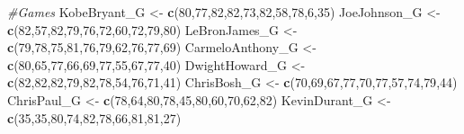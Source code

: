 \documentclass[
]{article}
\newenvironment{Shaded}{\begin{snugshade}}{\end{snugshade}}
\newcommand{\CommentTok}[1]{\textcolor[rgb]{0.56,0.35,0.01}{\textit{#1}}}
\newcommand{\DecValTok}[1]{\textcolor[rgb]{0.00,0.00,0.81}{#1}}
\newcommand{\KeywordTok}[1]{\textcolor[rgb]{0.13,0.29,0.53}{\textbf{#1}}}
\newcommand{\NormalTok}[1]{#1}
\newcommand{\StringTok}[1]{\textcolor[rgb]{0.31,0.60,0.02}{#1}}
\begin{document}
\begin{Shaded}
\begin{Highlighting}[]
\CommentTok{#Games }
\NormalTok{KobeBryant_G <-}\StringTok{ }\KeywordTok{c}\NormalTok{(}\DecValTok{80}\NormalTok{,}\DecValTok{77}\NormalTok{,}\DecValTok{82}\NormalTok{,}\DecValTok{82}\NormalTok{,}\DecValTok{73}\NormalTok{,}\DecValTok{82}\NormalTok{,}\DecValTok{58}\NormalTok{,}\DecValTok{78}\NormalTok{,}\DecValTok{6}\NormalTok{,}\DecValTok{35}\NormalTok{)}
\NormalTok{JoeJohnson_G <-}\StringTok{ }\KeywordTok{c}\NormalTok{(}\DecValTok{82}\NormalTok{,}\DecValTok{57}\NormalTok{,}\DecValTok{82}\NormalTok{,}\DecValTok{79}\NormalTok{,}\DecValTok{76}\NormalTok{,}\DecValTok{72}\NormalTok{,}\DecValTok{60}\NormalTok{,}\DecValTok{72}\NormalTok{,}\DecValTok{79}\NormalTok{,}\DecValTok{80}\NormalTok{)}
\NormalTok{LeBronJames_G <-}\StringTok{ }\KeywordTok{c}\NormalTok{(}\DecValTok{79}\NormalTok{,}\DecValTok{78}\NormalTok{,}\DecValTok{75}\NormalTok{,}\DecValTok{81}\NormalTok{,}\DecValTok{76}\NormalTok{,}\DecValTok{79}\NormalTok{,}\DecValTok{62}\NormalTok{,}\DecValTok{76}\NormalTok{,}\DecValTok{77}\NormalTok{,}\DecValTok{69}\NormalTok{)}
\NormalTok{CarmeloAnthony_G <-}\StringTok{ }\KeywordTok{c}\NormalTok{(}\DecValTok{80}\NormalTok{,}\DecValTok{65}\NormalTok{,}\DecValTok{77}\NormalTok{,}\DecValTok{66}\NormalTok{,}\DecValTok{69}\NormalTok{,}\DecValTok{77}\NormalTok{,}\DecValTok{55}\NormalTok{,}\DecValTok{67}\NormalTok{,}\DecValTok{77}\NormalTok{,}\DecValTok{40}\NormalTok{)}
\NormalTok{DwightHoward_G <-}\StringTok{ }\KeywordTok{c}\NormalTok{(}\DecValTok{82}\NormalTok{,}\DecValTok{82}\NormalTok{,}\DecValTok{82}\NormalTok{,}\DecValTok{79}\NormalTok{,}\DecValTok{82}\NormalTok{,}\DecValTok{78}\NormalTok{,}\DecValTok{54}\NormalTok{,}\DecValTok{76}\NormalTok{,}\DecValTok{71}\NormalTok{,}\DecValTok{41}\NormalTok{)}
\NormalTok{ChrisBosh_G <-}\StringTok{ }\KeywordTok{c}\NormalTok{(}\DecValTok{70}\NormalTok{,}\DecValTok{69}\NormalTok{,}\DecValTok{67}\NormalTok{,}\DecValTok{77}\NormalTok{,}\DecValTok{70}\NormalTok{,}\DecValTok{77}\NormalTok{,}\DecValTok{57}\NormalTok{,}\DecValTok{74}\NormalTok{,}\DecValTok{79}\NormalTok{,}\DecValTok{44}\NormalTok{)}
\NormalTok{ChrisPaul_G <-}\StringTok{ }\KeywordTok{c}\NormalTok{(}\DecValTok{78}\NormalTok{,}\DecValTok{64}\NormalTok{,}\DecValTok{80}\NormalTok{,}\DecValTok{78}\NormalTok{,}\DecValTok{45}\NormalTok{,}\DecValTok{80}\NormalTok{,}\DecValTok{60}\NormalTok{,}\DecValTok{70}\NormalTok{,}\DecValTok{62}\NormalTok{,}\DecValTok{82}\NormalTok{)}
\NormalTok{KevinDurant_G <-}\StringTok{ }\KeywordTok{c}\NormalTok{(}\DecValTok{35}\NormalTok{,}\DecValTok{35}\NormalTok{,}\DecValTok{80}\NormalTok{,}\DecValTok{74}\NormalTok{,}\DecValTok{82}\NormalTok{,}\DecValTok{78}\NormalTok{,}\DecValTok{66}\NormalTok{,}\DecValTok{81}\NormalTok{,}\DecValTok{81}\NormalTok{,}\DecValTok{27}\NormalTok{)}

\end{Highlighting}
\end{Shaded}
\end{document}
